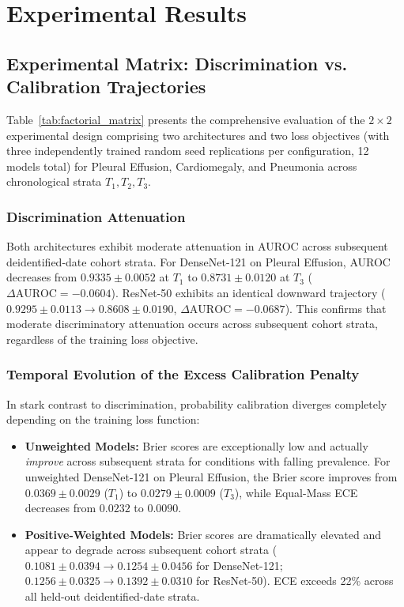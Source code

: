 \documentclass[preprint,12pt]{elsarticle}
\begin{document}
\section{Experimental Results}

\subsection{Experimental Matrix: Discrimination vs. Calibration Trajectories}
Table~\ref{tab:factorial_matrix} presents the comprehensive evaluation of the $2 \times 2$ experimental design comprising two architectures and two loss objectives (with three independently trained random seed replications per configuration, 12 models total) for Pleural Effusion, Cardiomegaly, and Pneumonia across chronological strata $T_1, T_2, T_3$.

\subsubsection{Discrimination Attenuation}
Both architectures exhibit moderate attenuation in AUROC across subsequent deidentified-date cohort strata. For DenseNet-121 on Pleural Effusion, AUROC decreases from $0.9335 \pm 0.0052$ at $T_1$ to $0.8731 \pm 0.0120$ at $T_3$ ($\Delta\text{AUROC} = -0.0604$). ResNet-50 exhibits an identical downward trajectory ($0.9295 \pm 0.0113 \to 0.8608 \pm 0.0190$, $\Delta\text{AUROC} = -0.0687$). This confirms that moderate discriminatory attenuation occurs across subsequent cohort strata, regardless of the training loss objective.

\subsubsection{Temporal Evolution of the Excess Calibration Penalty}
In stark contrast to discrimination, probability calibration diverges completely depending on the training loss function:
\begin{itemize}
    \item \textbf{Unweighted Models:} Brier scores are exceptionally low and actually \textit{improve} across subsequent strata for conditions with falling prevalence. For unweighted DenseNet-121 on Pleural Effusion, the Brier score improves from $0.0369 \pm 0.0029$ ($T_1$) to $0.0279 \pm 0.0009$ ($T_3$), while Equal-Mass ECE decreases from $0.0232$ to $0.0090$.
    \item \textbf{Positive-Weighted Models:} Brier scores are dramatically elevated and appear to degrade across subsequent cohort strata ($0.1081 \pm 0.0394 \to 0.1254 \pm 0.0456$ for DenseNet-121; $0.1256 \pm 0.0325 \to 0.1392 \pm 0.0310$ for ResNet-50). ECE exceeds 22\% across all held-out deidentified-date strata.
\end{itemize}
\end{document}
